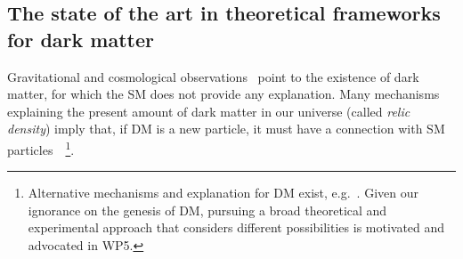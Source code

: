 \subsection{The state of the art in theoretical frameworks for dark matter}
\label{sub:stateOfTheArtTheory}
\smallskip

Gravitational and cosmological observations~\cite{Bertone:2016nfn} point to the existence of dark matter, for which the SM does not provide any explanation. 
Many mechanisms explaining the present amount of dark matter in our universe (called \textit{relic density}) imply that, if DM is a new particle, it must have a connection with SM particles~\cite{Hall:2009bx,Bernal:2017kxu,Steigman:2012nb}~\footnote{Alternative mechanisms and explanation for DM exist, e.g.~\cite{McGaugh_2016,Lennon:2017tqq,Bird:2016dcv,Marsh:2015xka}. Given our ignorance on the genesis of DM, pursuing a broad theoretical and experimental approach that considers different possibilities is motivated and advocated in WP5.}. 

